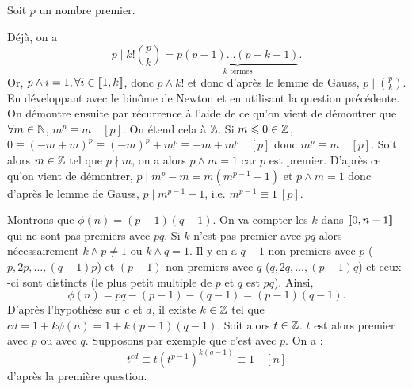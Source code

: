 \documentclass{magnolia}
\begin{document}
\begin{sol}
\begin{questions}
\question 
Soit $p$ un nombre premier.
  \begin{questions}
  \question  Déjà, on a $$p\mid k!\binom{p}{k}=\underbrace{p(p-1)\ldots (p-k+1)}_{k \text{ termes}}.$$
Or, $p\wedge i=1, \forall i \in \left\llbracket 1,k\right\rrbracket$, donc $p\wedge k!$ et donc d'après le lemme de Gauss, $p\mid \binom{p}{k}$.
  \question  En développant avec le binôme de Newton et en utilisant la question précédente.
  \question  On démontre ensuite par récurrence à l'aide de ce qu'on vient de démontrer que $\forall m \in \mathbb{N}$, $m^p\equiv m \quad [p]$. On étend cela à $\mathbb{Z}$. Si $m\leqslant 0\in \mathbb{Z}$, $0\equiv (-m+m)^p\equiv (-m)^p+m^p \equiv -m+m^p \quad [p]$ donc $m^p\equiv m \quad [p]$.
  \question  Soit alors $m\in \mathbb{Z}$ tel que $p\nmid m$, on a alors $p\wedge m=1$ car $p$ est premier. D'après ce qu'on vient de démontrer, $p\mid m^p-m=m(m^{p-1}-1)$ et $p\wedge m=1$ donc d'après le lemme de Gauss, $p\mid m^{p-1}-1$, i.e. $m^{p-1}\equiv 1\ [p]$.
  \end{questions}
\question  
  \begin{questions}
  \question Montrons que $\phi(n)=(p-1)(q-1)$. On va compter les $k$ dans $\left\llbracket 0,n-1\right\rrbracket$ qui ne sont pas premiers avec $pq$. Si $k$ n'est pas premier avec $pq$ alors nécessairement $k\wedge p\neq 1$ ou $k\wedge q=1$. Il y en a $q-1$ non premiers avec $p$ ($p, 2p, \ldots, (q-1)p$) et $(p-1)$ non premiers avec $q$ ($q,2q,\ldots,(p-1)q$) et ceux -ci sont distincts (le plus petit multiple de $p$ et $q$ est $pq$). Ainsi, $$\phi(n)=pq-(p-1)-(q-1)=(p-1)(q-1).$$
  \question D'après l'hypothèse sur $c$ et $d$, il existe $k\in\mathbb{Z}$ tel que $cd=1+k\phi(n)=1+k(p-1)(q-1)$. Soit alors $t\in\mathbb{Z}$. $t$ est alors premier avec $p$ ou avec $q$. Supposons par exemple que c'est avec $p$.  On a :
  $$t^{cd}\equiv t(t^{p-1})^{k(q-1)} \equiv 1 \quad [n]$$ d'après la première question.
  \end{questions}
\end{questions}


\end{sol}
\end{document}
